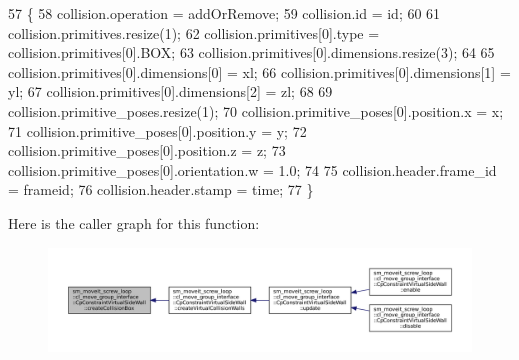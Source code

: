 \begin{DoxyCode}
57         \{
58             collision.operation = addOrRemove;
59             collision.id = id;
60 
61             collision.primitives.resize(1);
62             collision.primitives[0].type = collision.primitives[0].BOX;
63             collision.primitives[0].dimensions.resize(3);
64 
65             collision.primitives[0].dimensions[0] = xl;
66             collision.primitives[0].dimensions[1] = yl;
67             collision.primitives[0].dimensions[2] = zl;
68 
69             collision.primitive\_poses.resize(1);
70             collision.primitive\_poses[0].position.x = x;
71             collision.primitive\_poses[0].position.y = y;
72             collision.primitive\_poses[0].position.z = z;
73             collision.primitive\_poses[0].orientation.w = 1.0;
74 
75             collision.header.frame\_id = frameid;
76             collision.header.stamp = time;
77         \}
\end{DoxyCode}
Here is the caller graph for this function\+:
\nopagebreak
\begin{figure}[H]
\begin{center}
\leavevmode
\includegraphics[width=350pt]{classsm__moveit__screw__loop_1_1cl__move__group__interface_1_1CpConstraintVirtualSideWall_a4f5a69da36fc2a882d0b36466b72452b_icgraph}
\end{center}
\end{figure}
\mbox{\label{classsm__moveit__screw__loop_1_1cl__move__group__interface_1_1CpConstraintVirtualSideWall_afea3c873645eee21c6ab1d3b43f59c35}} 
